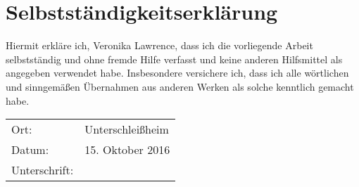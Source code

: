 \section*{Selbstst\"andigkeitserkl\"arung}

Hiermit erkl\"are ich, Veronika Lawrence, dass ich die vorliegende Arbeit selbstst\"andig und ohne fremde Hilfe 
verfasst und keine anderen Hilfsmittel als angegeben verwendet habe. Insbesondere versichere ich, dass ich alle w\"ortlichen und sinngem\"aßen \"Ubernahmen aus anderen Werken 
als solche kenntlich gemacht habe. 

\vspace{3mm}
\begin{table}[htb]
	\begin{tabular}{p{3cm} l}
		\rule{0pt}{3ex}Ort: & Unterschlei\ss{}heim\\
		\rule{0pt}{3ex}Datum: &15. Oktober 2016\\%
		\rule{0pt}{3ex}Unterschrift:&\\
	\end{tabular}
	\vspace{3mm}

\end{table}